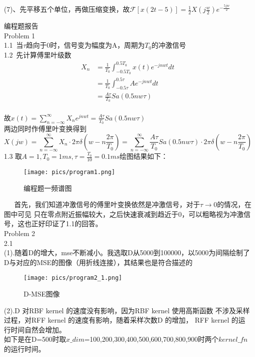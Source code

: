 \documentclass[answers]{exam}  %
\begin{document}
\begin{questions}
\begin{solution}
	(7)、先平移五个单位，再做压缩变换，故$\mathcal{F}[x(2t-5)]=\frac{1}{2}X(j\frac{w}{2})e^{-\frac{5jw}{2}}$
\end{solution}
\newpage
\Huge{编程题报告}\\
\Large{Problem 1}\\
1.1\ 当$\tau$趋向于0时，信号变为幅度为A，周期为$T_0$的冲激信号\\
1.2\ 先计算傅里叶级数\\
\begin{align*}
	X_n&=\frac{1}{T_0}\int_{-0.5T_0}^{0.5T_0}x(t)e^{-jnwt}dt\\
	&=\frac{1}{T_0}\int_{-0.5\tau}^{0.5\tau}Ae^{-jnwt}dt\\
	&=\frac{A\tau}{T_0}Sa(0.5nw\tau)
\end{align*}\\
故$x(t)=\sum\limits_{n=-\infty}^{\infty}X_ne^{jnwt}=\frac{A\tau}{T_0}Sa(0.5nw\tau)$\\
两边同时作傅里叶变换得到$$X(jw)=\sum\limits_{n=-\infty}^{\infty}X_n\cdot2\pi\delta(w-n\frac{2\pi}{T_0})=\sum\limits_{n=-\infty}^{\infty}\frac{A\tau}{T_0}Sa(0.5nw\tau)\cdot2\pi\delta(w-n\frac{2\pi}{T_0})$$
1.3 取$A=1,T_0=1ms,\tau=\frac{T_0}{10}=0.1ms$绘图结果如下：\\
\begin{figure}[h]
	\centering
	\texttt{[image: pics/program1.png]}
	\caption{编程题一频谱图}
\end{figure}
\ \ \ 首先，我们知道冲激信号的傅里叶变换依然是冲激信号，对于$\tau\rightarrow0$的情况，在图中可见
只在零点附近振幅较大，之后快速衰减到趋近于0，可以粗略视为冲激信号，这也正好印证了1.1的回答。\\
\newpage
\Large{Problem 2}\\
2.1\ \\
(1).随着D的增大，mse不断减小。我选取D从5000到100000，以5000为间隔绘制了D与对应的MSE的图像（用折线连接），其结果也是符合描述的\\
\begin{figure}[h]
	\centering
	\texttt{[image: pics/program2\_1.png]}
	\caption{D-MSE图像}
\end{figure}
(2).D 对RBF kernel 的速度没有影响，因为RBF kernel 使用高斯函数
不涉及采样过程，对RFF kernel 的速度有影响，随着采样次数D 的增加，
RFF kernel 的运行时间自然会增加。\\
如下是在D=500时取$x\_dim$=100,200,300,400,500,600,700,800,900时两个$kernel\_fn$的运行时间。


\end{questions}
\end{document}
